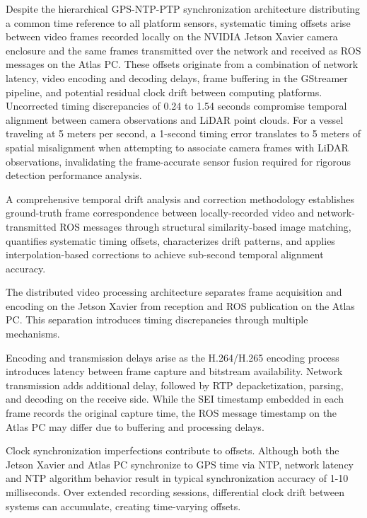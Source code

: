 \documentclass{erauthesis}
\begin{document}
Despite the hierarchical GPS-NTP-PTP synchronization architecture distributing a common time reference to all platform sensors, systematic timing offsets arise between video frames recorded locally on the NVIDIA Jetson Xavier camera enclosure and the same frames transmitted over the network and received as ROS messages on the Atlas PC.
These offsets originate from a combination of network latency, video encoding and decoding delays, frame buffering in the GStreamer pipeline, and potential residual clock drift between computing platforms.
Uncorrected timing discrepancies of 0.24 to 1.54 seconds compromise temporal alignment between camera observations and LiDAR point clouds.
For a vessel traveling at 5 meters per second, a 1-second timing error translates to 5 meters of spatial misalignment when attempting to associate camera frames with LiDAR observations, invalidating the frame-accurate sensor fusion required for rigorous detection performance analysis.

A comprehensive temporal drift analysis and correction methodology establishes ground-truth frame correspondence between locally-recorded video and network-transmitted ROS messages through structural similarity-based image matching, quantifies systematic timing offsets, characterizes drift patterns, and applies interpolation-based corrections to achieve sub-second temporal alignment accuracy.


The distributed video processing architecture separates frame acquisition and encoding on the Jetson Xavier from reception and ROS publication on the Atlas PC.
This separation introduces timing discrepancies through multiple mechanisms.

Encoding and transmission delays arise as the H.264/H.265 encoding process introduces latency between frame capture and bitstream availability.
Network transmission adds additional delay, followed by RTP depacketization, parsing, and decoding on the receive side.
While the SEI timestamp embedded in each frame records the original capture time, the ROS message timestamp on the Atlas PC may differ due to buffering and processing delays.

Clock synchronization imperfections contribute to offsets.
Although both the Jetson Xavier and Atlas PC synchronize to GPS time via NTP, network latency and NTP algorithm behavior result in typical synchronization accuracy of 1-10 milliseconds.
Over extended recording sessions, differential clock drift between systems can accumulate, creating time-varying offsets.
\end{document}
